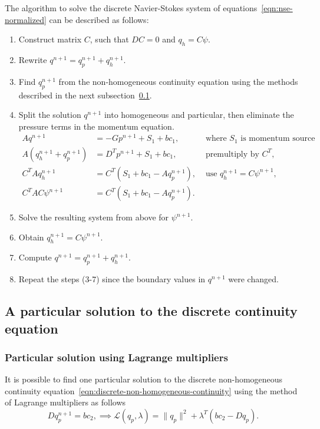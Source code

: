 \documentclass{article}
\begin{document}
The algorithm to solve the discrete Navier-Stokes system of equations~\eqref{eqn:nse-normalized} can be described as follows:
\begin{enumerate}
	\item Construct matrix $C$, such that $DC=0$ and $q_h=C\psi$.
	\item Rewrite $q^{n+1}=q^{n+1}_p+q^{n+1}_h$.
	\item Find $q^{n+1}_p$ from the non-homogeneous continuity equation using the methods described in the next subsection~\ref{sec:continuity-particular-solution}.
	\item Split the solution $q^{n+1}$ into homogeneous and particular, then eliminate the pressure terms in the momentum equation.
		\begin{align*}
			Aq^{n+1}&=-Gp^{n+1}+S_1+bc_1,&\text{ where $S_1$ is momentum source term,}\\
			A(q^{n+1}_h+q^{n+1}_p)&=D^Tp^{n+1}+S_1+bc_1, &\text{ premultiply by $C^T$,} \\
			C^TAq^{n+1}_h&=C^T(S_1+bc_1-Aq^{n+1}_p), &\text{ use $q^{n+1}_h=C\psi^{n+1}$,}\\
			C^TAC\psi^{n+1}&=C^T(S_1+bc_1-Aq^{n+1}_p).
		\end{align*}
	\item Solve the resulting system from above for $\psi^{n+1}$. 
	\item Obtain $q_h^{n+1}=C\psi^{n+1}$.
	\item Compute $q^{n+1}=q^{n+1}_p+q^{n+1}_h$.
	\item Repeat the steps (3-7) since the boundary values in $q^{n+1}$ were changed.
\end{enumerate}



\subsection{A particular solution to the discrete continuity equation}\label{sec:continuity-particular-solution}
\subsubsection{Particular solution using Lagrange multipliers}
It is possible to find one particular solution to the discrete non-homogeneous continuity equation~\eqref{eqn:discrete-non-homogeneous-continuity} using the method of Lagrange multipliers as follows
\begin{equation}\label{eqn:lagrange-multipliers}
	Dq_p^{n+1}=bc_2,\implies \mathcal{L}(q_p,\lambda)=
\|q_p\|^2+\lambda^T(bc_2-D q_p).
\end{equation}
\end{document}
